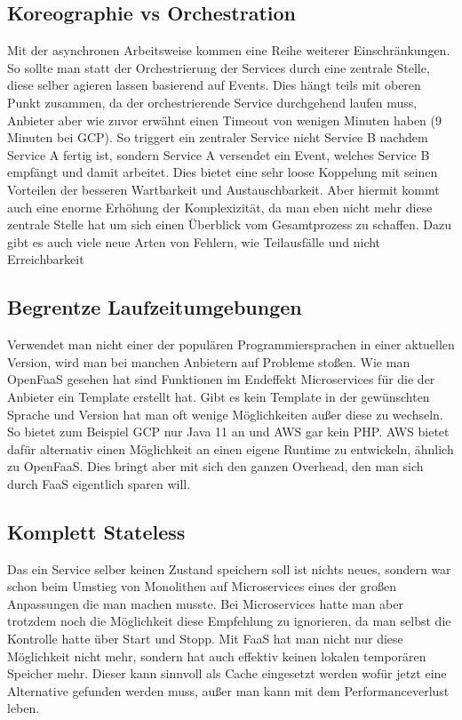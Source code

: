\documentclass[12pt, a4paper]{article}
\begin{document}
\subsection{Koreographie vs Orchestration}
Mit der asynchronen Arbeitsweise kommen eine Reihe weiterer Einschränkungen.
So sollte man statt der Orchestrierung der Services durch eine zentrale Stelle, diese selber agieren lassen basierend auf Events.
Dies hängt teils mit oberen Punkt zusammen, da der orchestrierende Service durchgehend laufen muss, Anbieter aber wie zuvor erwähnt einen Timeout von wenigen Minuten haben (9 Minuten bei \ac{GCP}).
So triggert ein zentraler Service nicht Service B nachdem Service A fertig ist, sondern Service A versendet ein Event, welches Service B empfängt und damit arbeitet.
Dies bietet eine sehr loose Koppelung mit seinen Vorteilen der besseren Wartbarkeit und Austauschbarkeit.
Aber hiermit kommt auch eine enorme Erhöhung der Komplexizität, da man eben nicht mehr diese zentrale Stelle hat um sich einen Überblick vom Gesamtprozess zu schaffen.
Dazu gibt es auch viele neue Arten von Fehlern, wie Teilausfälle und nicht Erreichbarkeit

\subsection{Begrentze Laufzeitumgebungen}
Verwendet man nicht einer der populären Programmiersprachen in einer aktuellen Version, wird man bei manchen Anbietern auf Probleme stoßen.
Wie man OpenFaaS gesehen hat sind Funktionen im Endeffekt Microservices für die der Anbieter ein Template erstellt hat.
Gibt es kein Template in der gewünschten Sprache und Version hat man oft wenige Möglichkeiten außer diese zu wechseln.
So bietet zum Beispiel \ac{GCP} nur Java 11 an und \ac{AWS} gar kein PHP.
\ac{AWS} bietet dafür alternativ einen Möglichkeit an einen eigene Runtime zu entwickeln, ähnlich zu OpenFaaS.
Dies bringt aber mit sich den ganzen Overhead, den man sich durch \ac{FaaS} eigentlich sparen will.

\subsection{Komplett Stateless}
Das ein Service selber keinen Zustand speichern soll ist nichts neues, sondern war schon beim Umstieg von Monolithen auf Microservices eines der großen Anpassungen die man machen musste.
Bei Microservices hatte man aber trotzdem noch die Möglichkeit diese Empfehlung zu ignorieren, da man selbst die Kontrolle hatte über Start und Stopp.
Mit \ac{FaaS} hat man nicht nur diese Möglichkeit nicht mehr, sondern hat auch effektiv keinen lokalen temporären Speicher mehr.
Dieser kann sinnvoll als Cache eingesetzt werden wofür jetzt eine Alternative gefunden werden muss, außer man kann mit dem Performanceverlust leben.
\end{document}
